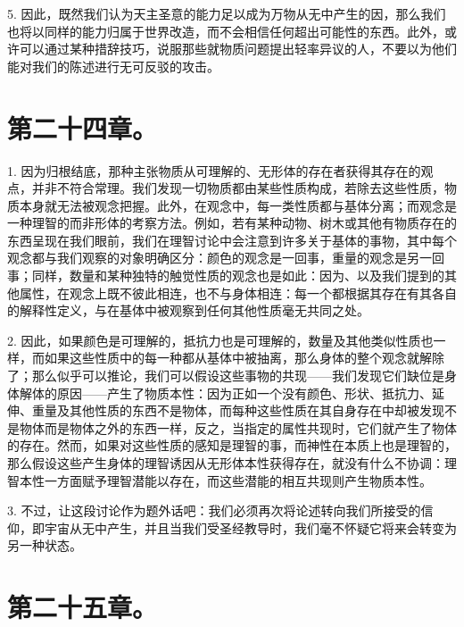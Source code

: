 5. 因此，既然我们认为天主圣意的能力足以成为万物从无中产生的因，那么我们也将以同样的能力归属于世界改造，而不会相信任何超出可能性的东西。此外，或许可以通过某种措辞技巧，说服那些就物质问题提出轻率异议的人，不要以为他们能对我们的陈述进行无可反驳的攻击。\par


\section{第二十四章。 }

1. 因为归根结底，那种主张物质从可理解的、无形体的存在者获得其存在的观点，并非不符合常理。我们发现一切物质都由某些性质构成，若除去这些性质，物质本身就无法被观念把握。此外，在观念中，每一类性质都与基体分离；而观念是一种理智的而非形体的考察方法。例如，若有某种动物、树木或其他有物质存在的东西呈现在我们眼前，我们在理智讨论中会注意到许多关于基体的事物，其中每个观念都与我们观察的对象明确区分：颜色的观念是一回事，重量的观念是另一回事；同样，数量和某种独特的触觉性质的观念也是如此：因为、以及我们提到的其他属性，在观念上既不彼此相连，也不与身体相连：每一个都根据其存在有其各自的解释性定义，与在基体中被观察到任何其他性质毫无共同之处。\par

2. 因此，如果颜色是可理解的，抵抗力也是可理解的，数量及其他类似性质也一样，而如果这些性质中的每一种都从基体中被抽离，那么身体的整个观念就解除了；那么似乎可以推论，我们可以假设这些事物的共现——我们发现它们缺位是身体解体的原因——产生了物质本性：因为正如一个没有颜色、形状、抵抗力、延伸、重量及其他性质的东西不是物体，而每种这些性质在其自身存在中却被发现不是物体而是物体之外的东西一样，反之，当指定的属性共现时，它们就产生了物体的存在。然而，如果对这些性质的感知是理智的事，而神性在本质上也是理智的，那么假设这些产生身体的理智诱因从无形体本性获得存在，就没有什么不协调：理智本性一方面赋予理智潜能以存在，而这些潜能的相互共现则产生物质本性。\par

3. 不过，让这段讨论作为题外话吧：我们必须再次将论述转向我们所接受的信仰，即宇宙从无中产生，并且当我们受圣经教导时，我们毫不怀疑它将来会转变为另一种状态。\par


\section{第二十五章。 }

